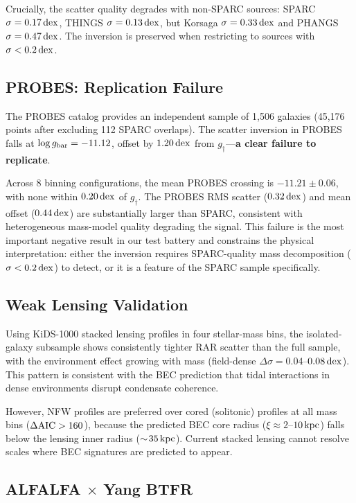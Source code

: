 \documentclass[twocolumn,twocolappendix]{aastex631}
\newcommand{\gbar}{g_{\rm bar}}
\newcommand{\gdag}{g_{\dagger}}
\newcommand{\dex}{\,{\rm dex}}
\newcommand{\daic}{\Delta{\rm AIC}}
\begin{document}
Crucially, the scatter quality degrades with non-SPARC sources:
SPARC $\sigma = 0.17\dex$, THINGS $\sigma = 0.13\dex$, but
Korsaga $\sigma = 0.33\dex$ and PHANGS $\sigma = 0.47\dex$.
The inversion is preserved when restricting to sources with
$\sigma < 0.2\dex$.

\subsection{PROBES: Replication Failure} \label{sec:probes}

The PROBES catalog \citep{Stone2022} provides an independent sample of
1{,}506 galaxies (45{,}176 points after excluding 112 SPARC overlaps).
The scatter inversion in PROBES falls at $\log\gbar = -11.12$, offset by
$1.20\dex$ from $\gdag$---\textbf{a clear failure to replicate}.

Across 8 binning configurations, the mean PROBES crossing is
$-11.21 \pm 0.06$, with none within $0.20\dex$ of $\gdag$. The PROBES RMS
scatter ($0.32\dex$) and mean offset ($0.44\dex$) are substantially larger
than SPARC, consistent with heterogeneous mass-model quality degrading the
signal. This failure is the most important negative result in our test
battery and constrains the physical interpretation: either the inversion
requires SPARC-quality mass decomposition ($\sigma < 0.2\dex$) to detect,
or it is a feature of the SPARC sample specifically.

\subsection{Weak Lensing Validation} \label{sec:lensing}

Using KiDS-1000 stacked lensing profiles \citep{Brouwer2021} in four
stellar-mass bins, the isolated-galaxy subsample shows consistently tighter
RAR scatter than the full sample, with the environment effect growing with
mass (field-dense $\Delta\sigma = 0.04$--$0.08\dex$). This pattern is
consistent with the BEC prediction that tidal interactions in dense
environments disrupt condensate coherence.

However, NFW profiles are preferred over cored (solitonic) profiles at all
mass bins ($\daic > 160$), because the predicted BEC core radius
($\xi \approx 2$--$10\,{\rm kpc}$) falls below the lensing inner radius
($\sim\!35\,{\rm kpc}$). Current stacked lensing cannot resolve scales
where BEC signatures are predicted to appear.

\subsection{ALFALFA $\times$ Yang BTFR} \label{sec:btfr}
\end{document}
